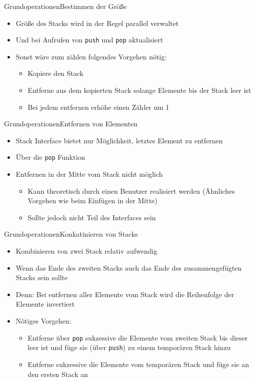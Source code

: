 \begin{frame}{Grundoperationen}{Bestimmen der Größe}
	\begin{itemize}
		\item Größe des Stacks wird in der Regel parallel verwaltet
		\item Und bei Aufrufen von \texttt{push} und \texttt{pop} aktualisiert
		\item Sonst wäre zum zählen folgendes Vorgehen nötig:
		\begin{itemize}
			\item Kopiere den Stack
			\item Entferne aus dem kopierten Stack solange Elemente bis der Stack leer ist
			\item Bei jedem entfernen erhöhe einen Zähler um 1
		\end{itemize}
	\end{itemize}
\end{frame}

\begin{frame}{Grundoperationen}{Entfernen von Elementen}
	\begin{itemize}
		\item Stack Interface bietet nur Möglichkeit, letztes Element zu entfernen
		\item Über die \texttt{pop} Funktion
		\item Entfernen in der Mitte vom Stack nicht möglich
		\begin{itemize}
			\item Kann theoretisch durch einen Benutzer realisiert werden (Ähnliches Vorgehen wie beim Einfügen in der Mitte)
			\item Sollte jedoch nicht Teil des Interfaces sein
		\end{itemize}
	\end{itemize}
\end{frame}

\begin{frame}{Grundoperationen}{Konkatinieren von Stacks}
	\begin{itemize}
		\item Kombinieren von zwei Stack relativ aufwendig
		\item Wenn das Ende des zweiten Stacks auch das Ende des zusammengefügten Stacks sein sollte
		\item Denn: Bei entfernen aller Elemente vom Stack wird die Reihenfolge der Elemente invertiert
		\item Nötiges Vorgehen:
		\begin{itemize}
			\item Entferne über \texttt{pop} sukzessive die Elemente vom zweiten Stack bis dieser leer ist und füge sie (über \texttt{push}) zu einem temporären Stack hinzu
			\item Entferne sukzessive die Elemente vom temporären Stack und füge sie an den ersten Stack an
		\end{itemize}
	\end{itemize}
\end{frame}

